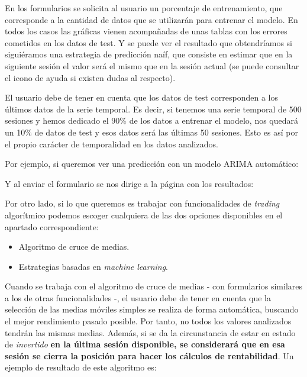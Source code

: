 En los formularios se solicita al usuario un porcentaje de entrenamiento, que corresponde a la cantidad de datos que se utilizarán para entrenar el modelo. En todos los casos las gráficas vienen acompañadas de unas tablas con los errores cometidos en los datos de test. Y se puede ver el resultado que obtendríamos si siguiéramos una estrategia de predicción naíf, que consiste en estimar que en la siguiente sesión el valor será el mismo que en la sesión actual (se puede consultar el icono de ayuda si existen dudas al respecto).

El usuario debe de tener en cuenta que los datos de test corresponden a los últimos datos de la serie temporal. Es decir, si tenemos una serie temporal de 500 sesiones y hemos dedicado el 90\% de los datos a entrenar el modelo, nos quedará un 10\% de datos de test y esos datos será las últimas 50 sesiones. Esto es así por el propio carácter de temporalidad en los datos analizados. 

\newpage
Por ejemplo, si queremos ver una predicción con un modelo ARIMA automático:


\newpage
Y al enviar el formulario se nos dirige a la página con los resultados:


Por otro lado, si lo que queremos es trabajar con funcionalidades de \emph{trading} algorítmico podemos escoger cualquiera de las dos opciones disponibles en el apartado correspondiente:

\begin{itemize}
\item
Algoritmo de cruce de medias.
\item
Estrategias basadas en \emph{machine learning}. 
\end{itemize}


Cuando se trabaja con el algoritmo de cruce de medias - con formularios similares a los de otras funcionalidades -, el usuario debe de tener en cuenta que la selección de las medias móviles simples se realiza de forma automática, buscando el mejor rendimiento pasado posible. Por tanto, no todos los valores analizados tendrán las mismas medias. Además, si se da la circunstancia de estar en estado de \emph{invertido} \textbf{en la última sesión disponible, se considerará que en esa sesión se cierra la posición para hacer los cálculos de rentabilidad}. Un ejemplo de resultado de este algoritmo es:

